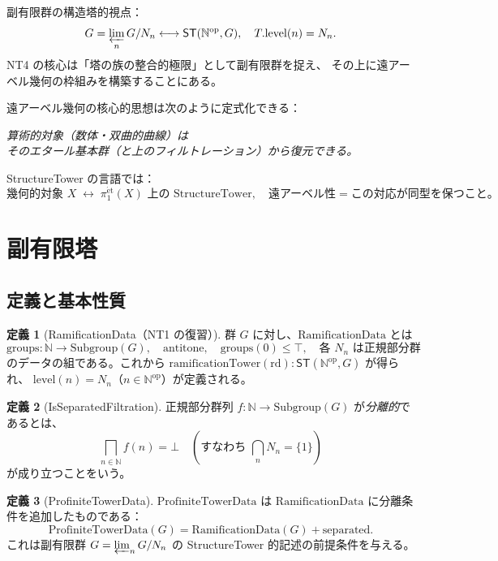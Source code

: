 \documentclass[a4paper,11pt]{ltjsarticle}
\theoremstyle{definition}
\newtheorem{definition}{定義}[section]
\theoremstyle{plain}
\theoremstyle{remark}
\newcommand{\ST}{\mathsf{ST}}
\newcommand{\lims}{\varprojlim}
\newcommand{\Nat}{\mathbb{N}}
\newcommand{\Nod}{\mathbb{N}^{\mathrm{op}}}
\newcommand{\pione}{\pi_1^{\mathrm{\acute{e}t}}}
\begin{document}
\begin{mathinsight}
副有限群の構造塔的視点：
\[
  G = \lims_n G/N_n \longleftrightarrow \ST(\Nod, G),\quad
  T.\mathrm{level}(n) = N_n.
\]
NT4 の核心は「塔の族の整合的極限」として副有限群を捉え、
その上に遠アーベル幾何の枠組みを構築することにある。
\end{mathinsight}

遠アーベル幾何の核心的思想は次のように定式化できる：
\begin{center}
  \textit{算術的対象（数体・双曲的曲線）は\\
  そのエタール基本群（と上のフィルトレーション）から復元できる。}
\end{center}

StructureTower の言語では：
\[
  \text{幾何的対象 } X \;\leftrightarrow\;
  \pione(X) \text{ 上の StructureTower},
  \quad
  \text{遠アーベル性} = \text{この対応が同型を保つこと。}
\]

\section{副有限塔}
\label{sec:profinite}

\subsection{定義と基本性質}

\begin{definition}[RamificationData（NT1 の復習）]
\label{def:ramdata}
群 $G$ に対し、$\mathrm{RamificationData}$ とは
\[
  \mathrm{groups} : \Nat \to \mathrm{Subgroup}(G),\quad
  \text{antitone},\quad
  \mathrm{groups}(0) \leq \top,\quad
  \text{各 } N_n \text{ は正規部分群}
\]
のデータの組である。これから \(\mathrm{ramificationTower}(\mathrm{rd}) : \ST(\Nod, G)\) が得られ、
$\mathrm{level}(n) = N_n$（$n \in \Nod$）が定義される。
\end{definition}

\begin{definition}[IsSeparatedFiltration]
正規部分群列 $f : \Nat \to \mathrm{Subgroup}(G)$ が\emph{分離的}であるとは、
\[
  \bigsqcap_{n \in \Nat} f(n) = \bot \quad
  (\text{すなわち } \bigcap_{n} N_n = \{1\})
\]
が成り立つことをいう。
\end{definition}

\begin{definition}[ProfiniteTowerData]
\label{def:profinite}
$\mathrm{ProfiniteTowerData}$ は $\mathrm{RamificationData}$ に分離条件を追加したものである：
\[
  \mathrm{ProfiniteTowerData}(G) = \mathrm{RamificationData}(G) + \mathrm{separated}.
\]
これは副有限群 $G = \lims_n G/N_n$ の StructureTower 的記述の前提条件を与える。
\end{definition}
\end{document}
